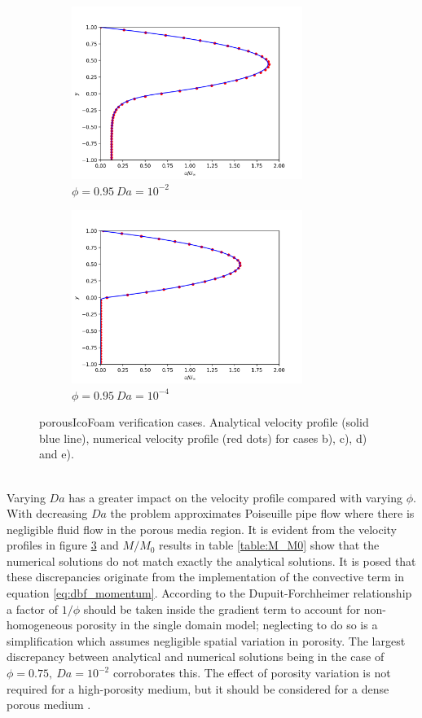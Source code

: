 \documentclass[a4paper,11pt]{report}
\begin{document}
\begin{figure}[ht]
\begin{subfigure}[b]{75mm}
    \end{subfigure}
    \\
    \begin{subfigure}[b]{75mm}
        \includegraphics[width=75mm]{"pty0-95_Da1e-2.png"}
        \caption{$\phi=0.95\ Da=10^{-2}$}
        \label{fig:pty0-95_Da1e-2}
    \end{subfigure}
    \begin{subfigure}[b]{75mm}
        \includegraphics[width=75mm]{"pty0-95_Da1e-4.png"}
        \caption{$\phi=0.95\ Da=10^{-4}$}
        \label{fig:pty0-95_Da1e-4}
    \end{subfigure}
    \caption{porousIcoFoam verification cases. Analytical velocity profile (solid blue line), numerical velocity profile (red dots) for cases b), c), d) and e).}\label{fig:porousIcoFoam_verification}
\end{figure}\\
Varying $Da$ has a greater impact on the velocity profile compared with varying $\phi$. With decreasing $Da$ the problem approximates Poiseuille pipe flow where there is negligible fluid flow in the porous media region. It is evident from the velocity profiles in figure \ref{fig:porousIcoFoam_verification} and $M/M_0$ results in table \ref{table:M_M0} show that the numerical solutions do not match exactly the analytical solutions. It is posed that these discrepancies originate from the implementation of the convective term in equation \ref{eq:dbf_momentum}. According to the Dupuit-Forchheimer relationship a factor of $1/\phi$ should be taken inside the gradient term to account for non-homogeneous porosity in the single domain model; neglecting to do so is a simplification which assumes negligible spatial variation in porosity. The largest discrepancy between analytical and numerical solutions being in the case of $\phi=0.75,\ Da=10^{-2}$ corroborates this. The effect of porosity variation is not required for a high-porosity medium, but it should be considered for a dense porous medium \cite{Vafai1995}.
\end{document}
